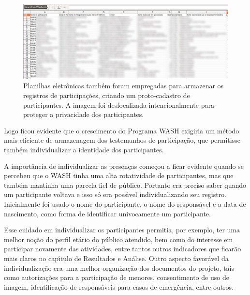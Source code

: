 \documentclass[
12pt,		%
openright,	%
twoside,  %
a4paper,			%
chapter=TITLE,		%
english,			%
french,				%
spanish,			%
brazil				%
]{USPSC-classe/USPSC}
\begin{document}
\begin{figure}[max size={\textwidth}{\textheight}]
\begin{minipage}[b]{0.4\linewidth}
        \centering
                \includegraphics[width=1.0\linewidth]{../../imagens/blurred-planilha2.png}
                \caption{Planilhas eletr\^onicas tamb\'em foram empregadas para armazenar os registros de participa\c{c}\~oes, criando um proto-cadastro de participantes. A imagem foi desfocalizada intencionalmente para proteger a privacidade dos participantes.}
                \label{b43907f0fa6b6fb935e7384ab03b508859ff0609}
\end{minipage}%
\hspace{0.5cm}
\end{figure}



Logo ficou evidente que o crescimento do Programa WASH exigiria um m\'etodo mais eficiente de armazenagem dos testemunhos de participa\c{c}\~ao, que permitisse tamb\'em individualizar a identidade dos participantes.









A import\^ancia de individualizar as presen\c{c}as come\c{c}ou a ficar evidente quando se percebeu que o WASH tinha uma alta rotatividade de participantes, mas que tamb\'em mantinha uma parcela fiel de \textquotedbl p\'ublico\textquotedbl . Portanto era preciso saber quando um participante voltava e isso s\'o era poss\'{\i}vel individualizando seu registro. Inicialmente foi usado o nome do participante, o nome do respons\'avel e a data de nascimento, como forma de identificar univocamente um participante.









Esse cuidado em individualizar os participantes permitia, por exemplo, ter uma melhor no\c{c}\~ao do perfil et\'ario do p\'ublico atendido, bem como do interesse em participar novamente das atividades, entre tantos outros indicadores que ficar\~ao mais claros no cap\'{\i}tulo de Resultados e An\'alise. Outro aspecto favor\'avel da individualiza\c{c}\~ao era uma melhor organiza\c{c}\~ao dos documentos do projeto, tais como autoriza\c{c}\~oes para a participa\c{c}\~ao de menores, consentimento de uso de imagem, identifica\c{c}\~ao de respons\'aveis para casos de emerg\^encia, entre outros.
\end{document}

